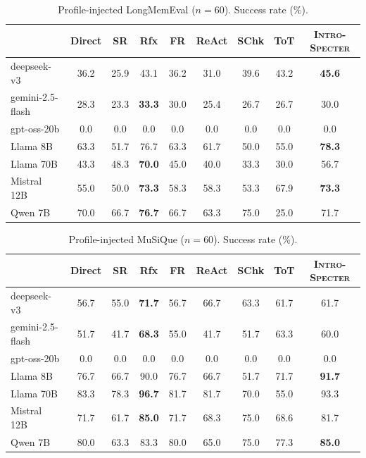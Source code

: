 \documentclass{article}
\newcommand{\method}{\textsc{Intro-Specter}\xspace}
\begin{document}
\begin{table}[t]\centering\small
\caption{Profile-injected LongMemEval ($n{=}60$). Success rate (\%).}
\label{tab:longmemeval-arch}\setlength{\tabcolsep}{3pt}
\begin{tabular}{l cccccccc}\toprule
& Direct & SR & Rfx & FR & ReAct & SChk & ToT & \method \\\midrule
deepseek-v3 & 36.2 & 25.9 & 43.1 & 36.2 & 31.0 & 39.6 & 43.2 & \textbf{45.6} \\
gemini-2.5-flash & 28.3 & 23.3 & \textbf{33.3} & 30.0 & 25.4 & 26.7 & 26.7 & 30.0 \\
gpt-oss-20b & 0.0 & 0.0 & 0.0 & 0.0 & 0.0 & 0.0 & 0.0 & 0.0 \\
Llama 8B & 63.3 & 51.7 & 76.7 & 63.3 & 61.7 & 50.0 & 55.0 & \textbf{78.3} \\
Llama 70B & 43.3 & 48.3 & \textbf{70.0} & 45.0 & 40.0 & 33.3 & 30.0 & 56.7 \\
Mistral 12B & 55.0 & 50.0 & \textbf{73.3} & 58.3 & 58.3 & 53.3 & 67.9 & \textbf{73.3} \\
Qwen 7B & 70.0 & 66.7 & \textbf{76.7} & 66.7 & 63.3 & 75.0 & 25.0 & 71.7 \\
\bottomrule\end{tabular}\end{table}

\begin{table}[t]\centering\small
\caption{Profile-injected MuSiQue ($n{=}60$). Success rate (\%).}
\label{tab:musique-arch}\setlength{\tabcolsep}{3pt}
\begin{tabular}{l cccccccc}\toprule
& Direct & SR & Rfx & FR & ReAct & SChk & ToT & \method \\\midrule
deepseek-v3 & 56.7 & 55.0 & \textbf{71.7} & 56.7 & 66.7 & 63.3 & 61.7 & 61.7 \\
gemini-2.5-flash & 51.7 & 41.7 & \textbf{68.3} & 55.0 & 41.7 & 51.7 & 63.3 & 60.0 \\
gpt-oss-20b & 0.0 & 0.0 & 0.0 & 0.0 & 0.0 & 0.0 & 0.0 & 0.0 \\
Llama 8B & 76.7 & 66.7 & 90.0 & 76.7 & 66.7 & 51.7 & 71.7 & \textbf{91.7} \\
Llama 70B & 83.3 & 78.3 & \textbf{96.7} & 81.7 & 81.7 & 70.0 & 55.0 & 93.3 \\
Mistral 12B & 71.7 & 61.7 & \textbf{85.0} & 71.7 & 68.3 & 75.0 & 68.6 & 81.7 \\
Qwen 7B & 80.0 & 63.3 & 83.3 & 80.0 & 65.0 & 75.0 & 77.3 & \textbf{85.0} \\
\bottomrule\end{tabular}\end{table}
\end{document}
